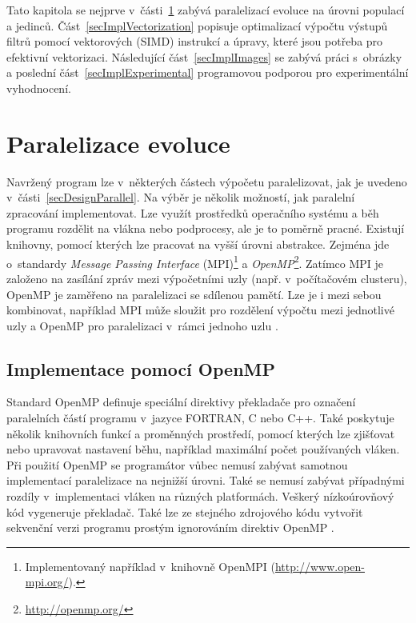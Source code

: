 Tato kapitola se nejprve v~části~\ref{secImplParalelization} zabývá paralelizací evoluce na úrovni populací a jedinců. Část~\ref{secImplVectorization} popisuje optimalizací výpočtu výstupů filtrů pomocí vektorových (SIMD) instrukcí a úpravy, které jsou potřeba pro efektivní vektorizaci. Následující část~\ref{secImplImages} se zabývá práci s~obrázky a poslední část~\ref{secImplExperimental} programovou podporou pro experimentální vyhodnocení.

\section{Paralelizace evoluce}
\label{secImplParalelization}

Navržený program lze v~některých částech výpočetu paralelizovat, jak je uvedeno v~části~\ref{secDesignParallel}. Na výběr je několik možností, jak paralelní zpracování implementovat. Lze využít prostředků operačního systému a běh programu rozdělit na vlákna nebo podprocesy, ale je to poměrně pracné. Existují knihovny, pomocí kterých lze pracovat na vyšší úrovni abstrakce. Zejména jde o~standardy \emph{Message Passing Interface} (MPI)\footnote{Implementovaný například v~knihovně OpenMPI (\url{http://www.open-mpi.org/}).} a \emph{OpenMP}\footnote{\url{http://openmp.org/}}. Zatímco MPI je založeno na zasílání zpráv mezi výpočetními uzly (např. v~počítačovém clusteru), OpenMP je zaměřeno na paralelizaci se sdílenou pamětí. Lze je i mezi sebou kombinovat, například MPI může sloužit pro rozdělení výpočtu mezi jednotlivé uzly a OpenMP pro paralelizaci v~rámci jednoho uzlu \cite{Quinn}.


\subsection{Implementace pomocí OpenMP}

Standard OpenMP definuje speciální direktivy překladače pro označení paralelních částí programu v~jazyce FORTRAN, C nebo C++. Také poskytuje několik knihovních funkcí a proměnných prostředí, pomocí kterých lze zjišťovat nebo upravovat nastavení běhu, například maximální počet používaných vláken. Při použití OpenMP se programátor vůbec nemusí zabývat samotnou implementací paralelizace na nejnižší úrovni. Také se nemusí zabývat případnými rozdíly v~implementaci vláken na různých platformách. Veškerý nízkoúrovňový kód vygeneruje překladač. Také lze ze stejného zdrojového kódu vytvořit sekvenční verzi programu prostým ignorováním direktiv OpenMP \cite{Quinn}.

